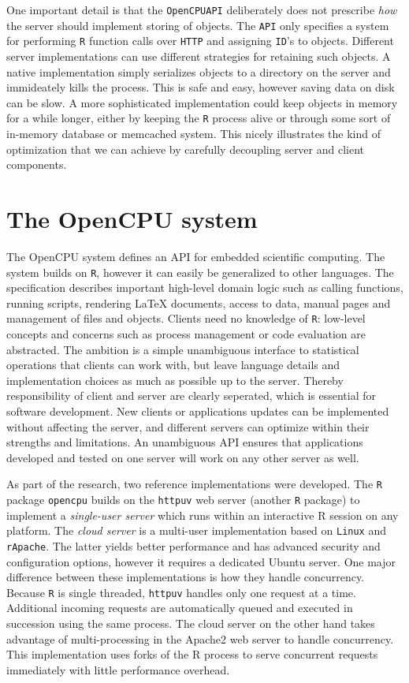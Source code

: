 \documentclass{article}
\newcommand{\R}{\texttt{R}\xspace}
\newcommand{\HTTP}{\texttt{HTTP}\xspace}
\newcommand{\API}{\texttt{API}\xspace}
\newcommand{\ID}{\texttt{ID}\xspace}
\newcommand{\OpenCPU}{\texttt{OpenCPU}\xspace}
\begin{document}
One important detail is that the \OpenCPU \API deliberately does not prescribe \emph{how} the server should implement storing of objects. The \API only specifies a system for performing \R function calls over \HTTP and assigning \ID's to objects. Different server implementations can use different strategies for retaining such objects. A native implementation simply serializes objects to a directory on the server and immideately kills the process. This is safe and easy, however saving data on disk can be slow. A more sophisticated implementation could keep objects in memory for a while longer, either by keeping the \R process alive or through some sort of in-memory database or memcached system. This nicely illustrates the kind of optimization that we can achieve by carefully decoupling server and client components.

\section{The OpenCPU system}

The OpenCPU system defines an API for embedded scientific computing. The system builds on \R, however it can easily be generalized to other languages. The specification describes important high-level domain logic such as calling functions, running scripts, rendering \LaTeX \xspace documents, access to data, manual pages and  management of files and objects. Clients need no knowledge of \R: low-level concepts and concerns such as process management or code evaluation are abstracted. The ambition is a simple unambiguous interface to statistical operations that clients can work with, but leave language details and implementation choices as much as possible up to the server. Thereby responsibility of client and server are clearly seperated, which is essential for software development. New clients or applications updates can be implemented without affecting the server, and different servers can optimize within their strengths and limitations. An unambiguous API ensures that applications developed and tested on one server will work on any other server as well. 

As part of the research, two reference implementations were developed. The \R package \texttt{opencpu} builds on the \texttt{httpuv} web server (another \R package) to implement a \emph{single-user server} which runs within an interactive R session on any platform. The \emph{cloud server} is a multi-user implementation based on \texttt{Linux} and \texttt{rApache}. The latter yields better performance and has advanced security and configuration options, however it requires a dedicated Ubuntu server. One major difference between these implementations is how they handle concurrency. Because \R is single threaded, \texttt{httpuv} handles only one request at a time. Additional incoming requests are automatically queued and executed in succession using the same process. The cloud server on the other hand takes advantage of multi-processing in the Apache2 web server to handle concurrency. This implementation uses forks of the R process to serve concurrent requests immediately with little performance overhead. 
\end{document}
